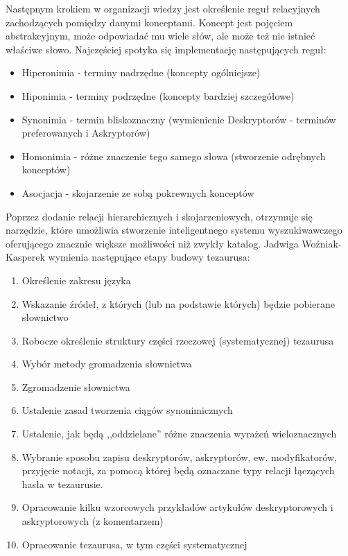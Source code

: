 Następnym krokiem w organizacji wiedzy jest określenie reguł relacyjnych zachodzących pomiędzy danymi konceptami. Koncept jest pojęciem abstrakcyjnym, może odpowiadać mu wiele słów, ale może też nie istnieć właściwe słowo. Najczęściej spotyka się implementację następujących reguł:
\begin{itemize}
   \item Hiperonimia - terminy nadrzędne (koncepty ogólniejsze)
	\item Hiponimia - terminy podrzędne (koncepty bardziej szczegółowe)
	\item Synonimia  - termin bliskoznaczny (wymienienie Deskryptorów - terminów preferowanych i Askryptorów)
	\item Homonimia - różne znaczenie tego samego słowa (stworzenie odrębnych konceptów)
	\item Asocjacja - skojarzenie ze sobą pokrewnych konceptów
\end{itemize} 
Poprzez dodanie relacji hierarchicznych i skojarzeniowych, otrzymuje się narzędzie, które umożliwia stworzenie inteligentnego systemu wyszukiwawczego oferującego znacznie większe możliwości niż zwykły katalog.   
Jadwiga Woźniak-Kasperek \cite{KasperekPoradnik} wymienia następujące etapy budowy tezaurusa: 
\begin{enumerate}
   \item Określenie zakresu języka
	\item Wskazanie  źródeł, z których (lub na podstawie których) będzie pobierane słownictwo
	\item Robocze określenie struktury części rzeczowej (systematycznej) tezaurusa 
	\item Wybór metody gromadzenia słownictwa
	\item Zgromadzenie słownictwa
	\item Ustalenie zasad tworzenia ciągów synonimicznych
	\item Ustalenie, jak będą ,,oddzielane'' różne znaczenia wyrażeń wieloznacznych
	\item Wybranie sposobu zapisu deskryptorów, askryptorów, ew. modyfikatorów, przyjęcie notacji, za pomocą której będą oznaczane 
typy relacji łączących hasła w tezaurusie.
	\item  Opracowanie kilku wzorcowych przykładów artykułów deskryptorowych i 
askryptorowych (z komentarzem)
	\item Opracowanie tezaurusa, w tym części systematycznej
\end{enumerate}
